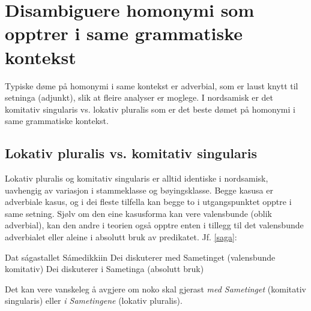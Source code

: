 \documentclass[a4paper,norsk]{article}
\begin{document}
\section{Disambiguere homonymi som opptrer i same grammatiske kontekst}



Typiske døme på homonymi i same kontekst er adverbial, som er laust knytt til setninga (adjunkt), slik at fleire analyser er moglege. I nordsamisk er det komitativ singularis vs. lokativ pluralis som er det beste dømet på homonymi i same grammatiske kontekst. %





\subsection{Lokativ pluralis vs. komitativ singularis}


Lokativ pluralis og komitativ singularis er alltid identiske i nordsamisk, uavhengig av variasjon i stammeklasse og bøyingsklasse. Begge kasusa er adverbiale kasus, og i dei fleste tilfella kan begge to i utgangspunktet opptre i same setning. Sjølv om den eine kasusforma kan vere valensbunde (oblik adverbial), kan den andre i teorien også opptre enten i tillegg til det valensbunde adverbialet eller aleine i absolutt bruk av predikatet. Jf. \ref{saga}:

\begin{example}\label{saga}
\glll Dat ságastallet Sámedikkiin 
      Dei diskuterer {med Sametinget (valensbunde komitativ)}
      Dei diskuterer {i Sametinga (absolutt bruk)} 
\gln      
\glend
\end{example}


Det kan vere vanskeleg å avgjere om noko skal gjerast \textit{med Sametinget} (komitativ singularis) eller \textit{i Sametingene} (lokativ pluralis). %
\end{document}
